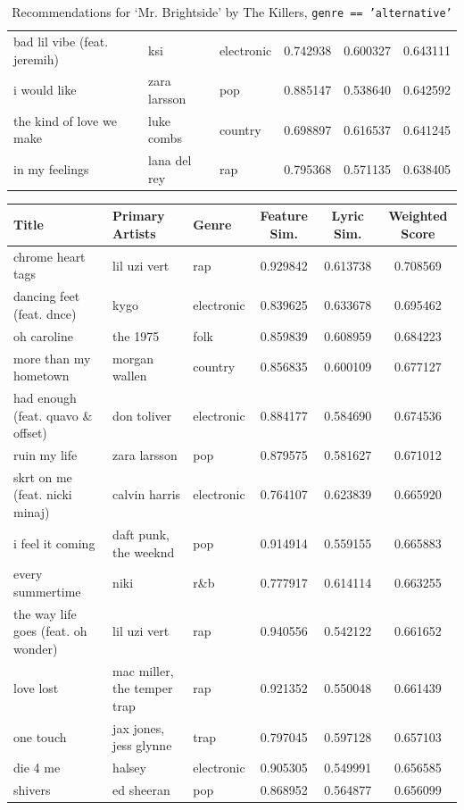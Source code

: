 \documentclass{article}
\begin{document}
\begin{table}[H]
\begin{tabular}{lll|ccc}
bad lil vibe (feat. jeremih) & ksi & electronic & 0.742938 & 0.600327 & 0.643111 \\
i would like & zara larsson & pop & 0.885147 & 0.538640 & 0.642592 \\
the kind of love we make & luke combs & country & 0.698897 & 0.616537 & 0.641245 \\
in my feelings & lana del rey & rap & 0.795368 & 0.571135 & 0.638405 \\
\end{tabular}
\vspace{0.5em}
\caption{Recommendations for `Mr. Brightside' by The Killers, \texttt{genre == 'alternative'}}
\end{table}

\begin{table}[H]
\centering
\tiny
\begin{tabular}{lll|ccc}
Title & Primary Artists & Genre & Feature Sim. & Lyric Sim. & Weighted Score \\
\hline
chrome heart tags & lil uzi vert & rap & 0.929842 & 0.613738 & 0.708569 \\
dancing feet (feat. dnce) & kygo & electronic & 0.839625 & 0.633678 & 0.695462 \\
oh caroline & the 1975 & folk & 0.859839 & 0.608959 & 0.684223 \\
more than my hometown & morgan wallen & country & 0.856835 & 0.600109 & 0.677127 \\
had enough (feat. quavo \& offset) & don toliver & electronic & 0.884177 & 0.584690 & 0.674536 \\
ruin my life & zara larsson & pop & 0.879575 & 0.581627 & 0.671012 \\
skrt on me (feat. nicki minaj) & calvin harris & electronic & 0.764107 & 0.623839 & 0.665920 \\
i feel it coming & daft punk, the weeknd & pop & 0.914914 & 0.559155 & 0.665883 \\
every summertime & niki & r\&b & 0.777917 & 0.614114 & 0.663255 \\
the way life goes (feat. oh wonder) & lil uzi vert & rap & 0.940556 & 0.542122 & 0.661652 \\
love lost & mac miller, the temper trap & rap & 0.921352 & 0.550048 & 0.661439 \\
one touch & jax jones, jess glynne & trap & 0.797045 & 0.597128 & 0.657103 \\
die 4 me & halsey & electronic & 0.905305 & 0.549991 & 0.656585 \\
shivers & ed sheeran & pop & 0.868952 & 0.564877 & 0.656099 \\

\end{tabular}
\end{table}
\end{document}
